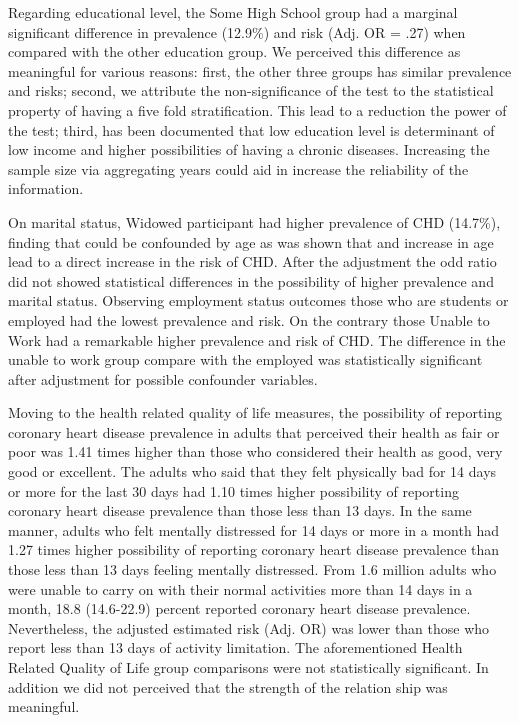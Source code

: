  Regarding educational level, the Some High School group had a marginal significant difference in prevalence (12.9\%) and risk (Adj. OR = .27) when compared with the other education group. We perceived this difference as meaningful for various reasons: first, the other three groups has similar prevalence and risks; second, we attribute the non-significance of the test to the statistical property of having a five fold stratification.  This lead to a reduction the power of the test; third, has been documented that low education level is determinant of low income and higher possibilities of having a chronic diseases.  Increasing the sample size via aggregating years could aid in increase the reliability of the information.
 
On marital status, Widowed participant had higher prevalence of CHD (14.7\%), finding that could be confounded by age as was shown that and increase in age lead to a direct increase in the risk of CHD.  After the adjustment the odd ratio did not showed statistical differences in the possibility of higher prevalence and marital status. Observing employment status outcomes those who are students or employed had the lowest prevalence and risk. On the contrary those Unable to Work had a remarkable higher prevalence and risk of CHD.  The difference in the unable to work group compare with the employed was statistically significant after adjustment for possible confounder variables.

Moving to the health related quality of life measures, the possibility of reporting coronary heart disease prevalence in adults that perceived their health as fair or poor was 1.41 times higher than those who considered their health as good, very good or excellent. The adults who said that they felt physically bad for 14 days or more for the last 30 days had 1.10 times higher possibility of reporting coronary heart disease prevalence than those less than 13 days. In the same manner, adults who felt mentally distressed for 14 days or more in a month had 1.27 times higher possibility of reporting coronary heart disease prevalence than those less than 13 days feeling mentally distressed. From 1.6 million adults who were unable to carry on with their normal activities more than 14 days in a month, 18.8 (14.6-22.9) percent reported coronary heart disease prevalence. Nevertheless, the adjusted estimated risk (Adj. OR) was lower than those who report less than 13 days of activity limitation.  The aforementioned Health Related Quality of Life group comparisons were not statistically significant.  In addition we did not perceived that the strength of the relation ship was meaningful.


